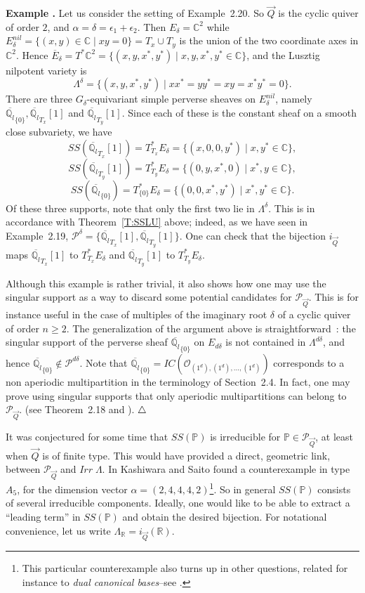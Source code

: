 \documentclass[a4paper,10pt]{amsart}
\def\endexample{$\hfill \triangle$}
\def\endexample{$\hfill \triangle$}
\def\a{\alpha}
\def\qlb{\overline{\mathbb{Q}_l}}
\def\C{\mathbb{C}}
\def\PQ{\mathcal{P}_{\vec{Q}}}
\numberwithin{equation}{section}
\begin{document}
\vspace{.2in}

\addtocounter{theo}{1}
\noindent \textbf{Example \thetheo .} Let us consider the setting of Example~2.20. So $\vec{Q}$ is the cyclic quiver of order $2$, and $\a=\delta=\epsilon_1+\epsilon_2$. Then $E_{\delta}=\C^2$ while $E^{nil}_{\delta}=\{(x,y) \in \C\;|\; xy=0\}=T_x \cup T_y$ is the union of the two coordinate axes in $\C^2$. 
Hence $\overline{E}_{\delta}=T^*\C^2=\{(x,y, x^*,y^*)\;|\; x,y,x^*,y^* \in \C\}$, and the Lusztig nilpotent variety is
$$\Lambda^{\delta}=\big\{(x,y,x^*,y^*)\;|\;xx^*=yy^*=xy=x^*y^*=0 \big\}.$$
There are three $G_{\delta}$-equivariant simple perverse sheaves on $E_{\delta}^{nil}$, namely $\qlb_{\{0\}}, \qlb_{T_x}[1]$ and $\qlb_{T_y}[1]$. Since each of these is the constant sheaf on a smooth close subvariety, we have
$$SS(\qlb_{T_x}[1])=T^*_{T_x}E_{\delta}=\{(x,0,0,y^*)\;|\; x,y^* \in \C\},$$
$$SS(\qlb_{T_y}[1])=T^*_{T_y}E_{\delta}=\{(0,y,x^*,0)\;|\; x^*,y \in \C\},$$
$$SS(\qlb_{\{0\}})=T^*_{\{0\}}E_{\delta}=\{(0,0,x^*,y^*)\;|\; x^*,y^* \in \C\}.$$
Of these three supports, note that only the first two lie in $\Lambda^{\delta}$. This is in accordance with Theorem~\ref{T:SSLU} above; indeed, as we have seen in Example~2.19, $\mathcal{P}^{\delta}=\{ \qlb_{T_x}[1], \qlb_{T_y}[1]\}$. One can check that the bijection $i_{\vec{Q}}$ maps $\qlb_{T_x}[1]$ to $T^*_{T_x} E_{\delta}$ and 
$\qlb_{T_y}[1]$ to $T^*_{T_y} E_{\delta}$.

\vspace{.1in}

Although this example is rather trivial, it also shows how one may use the singular support as a way to discard some potential candidates for $\PQ$. This is
for instance useful in the case of multiples of the imaginary root $\delta$ of a cyclic quiver of order $n \geq 2$. The generalization of the argument above is straightforward~: the singular support of the perverse sheaf $\qlb_{\{0\}}$ on $E_{d\delta}$ is not contained in $\Lambda^{d\delta}$, and hence $\qlb_{\{0\}} \not\in \mathcal{P}^{d\delta}$. Note that $\qlb_{\{0\}}=IC(\mathcal{O}_{(1^d), (1^d), \ldots, (1^d)})$ corresponds to a non aperiodic multipartition in the terminology of Section~2.4. In fact, one may prove using singular supports that only aperiodic multipartitions can belong to $\PQ$. (see Theorem~2.18 and \cite[Section~10]{Lusaff}).
\endexample

\vspace{.2in}

It was conjectured for some time that $SS(\mathbb{P})$ is irreducible for $\mathbb{P} \in \PQ$, at least when $\vec{Q}$ is of finite type. This would have provided a direct, geometric link, between $\PQ$ and $Irr\;\Lambda$. In \cite{KS} Kashiwara and Saito found a counterexample in type $A_5$, for the dimension vector $\a=(2,4,4,4,2)$\footnote{This particular counterexample also turns up in other questions, related for instance to \textit{dual canonical bases}--see \cite{Leclerc}.}. So in general $SS(\mathbb{P})$ consists of several irreducible components. Ideally, one would like to be able to extract a ``leading term'' in $SS(\mathbb{P})$ and obtain the desired bijection. For notational convenience, let us write $\Lambda_{\mathbb{R}}=i_{\vec{Q}}(\mathbb{R})$.
\end{document}
